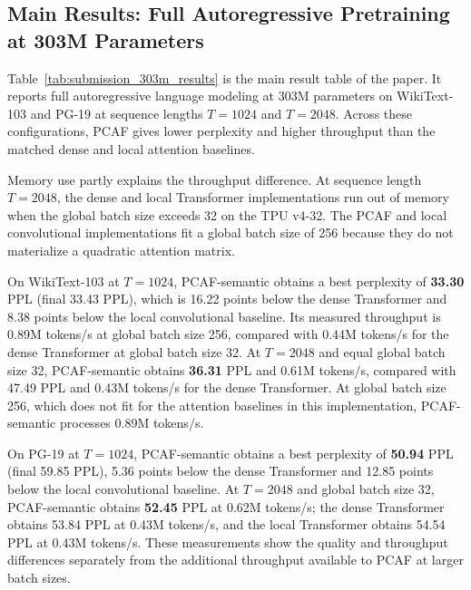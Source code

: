\documentclass{article}
\begin{document}
\subsection{Main Results: Full Autoregressive Pretraining at 303M Parameters}
\label{sec:full-ar-303m}

Table~\ref{tab:submission_303m_results} is the main result table of the paper.
It reports full autoregressive language modeling at 303M parameters on
WikiText-103 and PG-19 at sequence lengths $T = 1024$ and $T = 2048$.
Across these configurations, PCAF gives lower perplexity and higher throughput
than the matched dense and local attention baselines.

Memory use partly explains the throughput difference. At sequence length
$T = 2048$, the dense and local Transformer implementations run out of memory
when the global batch size exceeds 32 on the TPU v4-32. The PCAF and local
convolutional implementations fit a global batch size of 256 because they do
not materialize a quadratic attention matrix.

On WikiText-103 at $T = 1024$, PCAF-semantic obtains a best perplexity of
\textbf{33.30} PPL (final 33.43 PPL), which is 16.22 points below the dense
Transformer and 8.38 points below the local convolutional baseline. Its measured
throughput is 0.89M tokens/s at global batch size 256, compared with 0.44M
tokens/s for the dense Transformer at global batch size 32. At $T = 2048$ and
equal global batch size 32, PCAF-semantic obtains \textbf{36.31} PPL and 0.61M
tokens/s, compared with 47.49 PPL and 0.43M tokens/s for the dense Transformer.
At global batch size 256, which does not fit for the attention baselines in this
implementation, PCAF-semantic processes 0.89M tokens/s.

On PG-19 at $T = 1024$, PCAF-semantic obtains a best perplexity of
\textbf{50.94} PPL (final 59.85 PPL), 5.36 points below the dense Transformer
and 12.85 points below the local convolutional baseline. At $T = 2048$ and
global batch size 32, PCAF-semantic obtains \textbf{52.45} PPL at 0.62M
tokens/s; the dense Transformer obtains 53.84 PPL at 0.43M tokens/s, and the
local Transformer obtains 54.54 PPL at 0.43M tokens/s. These measurements show
the quality and throughput differences separately from the additional
throughput available to PCAF at larger batch sizes.
\end{document}
